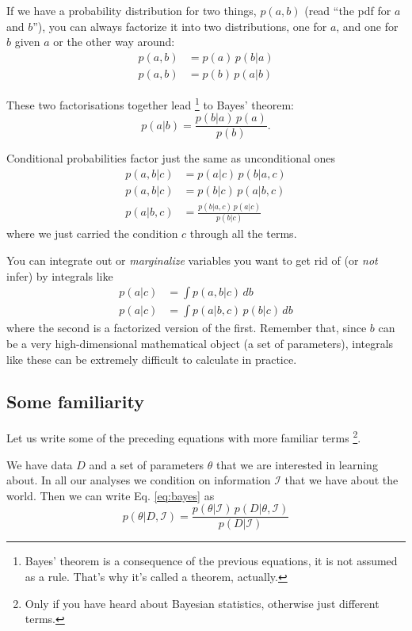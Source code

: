 \documentclass[a4paper,11pt]{article}
\begin{document}
If we have a probability distribution for two things, $p(a,b)$ (read ``the pdf for $a$ and
$b$''), you can always factorize it into two distributions, one for $a$, and one for $b$ given $a$ or the other way around:
%
\begin{align}
   p(a,b) &= p(a) \, p(b|a)\\
   p(a,b) &= p(b) \, p(a|b)
\end{align}
%

These two factorisations together lead%
\footnote{Bayes' theorem is a consequence of the previous equations, it is not assumed as a rule. That's why it's called a theorem, actually.} to Bayes' theorem:
%
\begin{equation}
   p(a|b) = \frac{p(b|a)\,p(a)}{p(b)} .
\end{equation}
%

Conditional probabilities factor just the same as unconditional ones
%
\begin{align}
   p(a,b|c) &= p(a|c) \, p(b|a,c)\\
   p(a,b|c) &= p(b|c) \, p(a|b,c)\\
   p(a|b,c) &= \frac{p(b|a,c)\,p(a|c)}{p(b|c)} \label{eq:bayes}
\end{align}
%   
where we just carried the condition $c$ through all the terms.

You can integrate out or \emph{marginalize} variables you want to get rid of (or \emph{not} infer) by integrals like
%
\begin{align}
   p(a|c) &= \int p(a,b|c) \, db \\
   p(a|c) &= \int p(a|b,c)\,p(b|c) \, db
\end{align}
%
where the second is a factorized version of the first.
Remember that, since $b$ can be a very high-dimensional mathematical object (a set of parameters), integrals like these can be extremely difficult to calculate in practice.


\subsection{Some familiarity}

Let us write some of the preceding equations with more familiar terms%
\footnote{Only if you have heard about Bayesian statistics, otherwise just different terms.}.

\noindent We have data $D$ and a set of parameters $\theta$ that we are interested in learning about. 
In all our analyses we condition on information $\mathcal{I}$ that we have about the world.
Then we can write Eq. \eqref{eq:bayes} as
%
\begin{equation}\label{eq:bayes2}
  p(\theta|D,\mathcal{I}) = \frac{p(\theta|\mathcal{I}) \, p(D|\theta,\mathcal{I})}{p(D|\mathcal{I})}
\end{equation}
\end{document}
